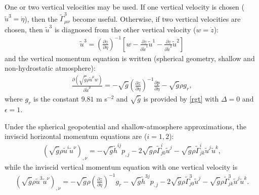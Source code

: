 \documentclass{article}
\begin{document}
One or two vertical velocities may be used. If one vertical velocity is chosen ($\tilde{u}^3=\dot\eta$), then the $\tilde{\Gamma}^3_{\mu\nu}$ become useful. Otherwise, if two vertical velocities are chosen, then $\tilde{u}^3$ is diagnosed from the other vertical velocity ($w=\dot z$):
\begin{align}
\tilde{u}^3=\left(\frac{\partial z}{\partial \eta}\right)^{-1}\left[ w - \frac{\partial z}{\partial \tilde{x}^1} \tilde{u}^1 - \frac{\partial z}{\partial \tilde{x}^2} \tilde{u}^2 \right]
\end{align}
and the vertical momentum equation is written (spherical geometry, shallow and non-hydrostatic atmosphere):
\begin{align}
\frac{\partial (\sqrt{\tilde{g}}\rho \tilde{u}^\mu w)}{\partial \tilde{x}^\mu}=-\sqrt{\tilde{g}} \left(\frac{\partial z}{\partial \eta}\right)^{-1} \frac{\partial p}{\partial\eta}-\sqrt{\tilde{g}}\rho g_r,
\end{align}
where $g_r$ is the constant $9.81$ m s$^{-2}$ and $\sqrt{\tilde{g}}$ is provided by \eqref{rgt} with $\Delta=0$ and $\epsilon=1$.

Under the spherical geopotential and shallow-atmosphere approximations, the inviscid horizontal momentum equations are ($i=1,2$):
\begin{align}
\left( \sqrt{\tilde{g}}\rho \tilde{u}^i\tilde{u}^\nu\right)_{,\nu} = - \sqrt{\tilde{g}}\tilde{h}^{ij}p_{,j} -2\sqrt{\tilde{g}} \rho \tilde{\Gamma}^i_{j0} \tilde{u}^j - \sqrt{\tilde{g}} \rho \tilde{\Gamma}^i_{jk}\tilde{u}^j\tilde{u}^k,
\end{align}
while the inviscid vertical momentum equation with one vertical velocity is
\begin{align}
\left( \sqrt{\tilde{g}}\rho \tilde{u}^3\tilde{u}^\nu\right)_{,\nu} = - \sqrt{\tilde{g}} \rho \left(\frac{\partial z}{\partial \eta}\right)^{-1} g_r - \sqrt{\tilde{g}}\tilde{h}^{3j}p_{,j} -2\sqrt{\tilde{g}} \rho \tilde{\Gamma}^3_{j0} \tilde{u}^j - \sqrt{\tilde{g}} \rho \tilde{\Gamma}^3_{jk}\tilde{u}^j\tilde{u}^k.
\end{align}
\end{document}
